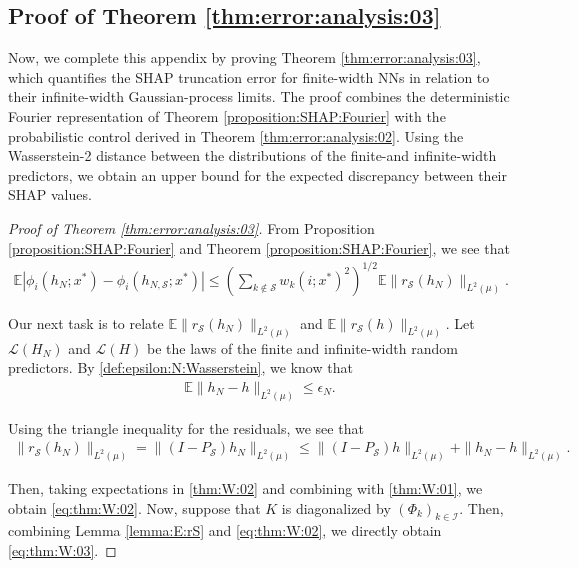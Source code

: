 \documentclass[letterpaper,11pt]{article}
\numberwithin{equation}{section}
\renewcommand{\leq}{\leqslant}
\numberwithin{equation}{section}
\begin{document}
\subsection{Proof of Theorem \ref{thm:error:analysis:03}}

Now, we complete this appendix by proving Theorem \ref{thm:error:analysis:03}, which quantifies the SHAP truncation error for finite-width NNs in relation to their infinite-width Gaussian-process limits. The proof combines the deterministic Fourier representation of Theorem \ref{proposition:SHAP:Fourier} with the probabilistic control derived in Theorem \ref{thm:error:analysis:02}. Using the Wasserstein-2 distance between the distributions of the finite-and infinite-width predictors, we obtain an upper bound for the expected discrepancy between their SHAP values.%

\begin{proof}[Proof of Theorem \ref{thm:error:analysis:03}]
    From Proposition \ref{proposition:SHAP:Fourier} and Theorem \ref{proposition:SHAP:Fourier}, we see that
    \begin{align}
        \label{thm:W:01}
        \mathbb{E}|\phi_i(h_N;x^*) - \phi_i(h_{N,\mathcal{S}}; x^*)|\leq \left( \sum_{k\notin \mathcal{S}} w_k(i;x^*)^2 \right)^{1/2} \mathbb{E}\|r_{\mathcal{S}} (h_N)\|_{L^2(\mu)}.
    \end{align}

    Our next task is to relate $\mathbb{E}\|r_{\mathcal{S}} (h_N)\|_{L^2(\mu)}$ and $\mathbb{E}\|r_{\mathcal{S}}(h)\|_{L^2(\mu)}$. Let $\mathcal{L}(H_N)$ and $\mathcal{L}(H)$ be the laws of the finite and infinite-width random predictors. By \eqref{def:epsilon:N:Wasserstein}, we know that %
    \begin{align*}
        \mathbb{E}\|h_N-h\|_{L^2(\mu)}\leq \epsilon_N.
    \end{align*}

    Using the triangle inequality for the residuals, we see that
    \begin{align}
        \label{thm:W:02}
        \|r_{\mathcal{S}}(h_N)\|_{L^2(\mu)}= \|(I-P_{\mathcal{S}})h_N\|_{L^2(\mu)}\leq \|(I-P_{\mathcal{S}})h\|_{L^2(\mu)} + \|h_N-h\|_{L^2(\mu)}.
    \end{align}

    Then, taking expectations in \eqref{thm:W:02} and combining with \eqref{thm:W:01}, we obtain \eqref{eq:thm:W:02}. Now, suppose that $K$ is diagonalized by $(\Phi_k)_{k\in \mathcal{I}}$. Then, combining Lemma \ref{lemma:E:rS} and \eqref{eq:thm:W:02}, we directly obtain \eqref{eq:thm:W:03}.     
\end{proof}
\end{document}
